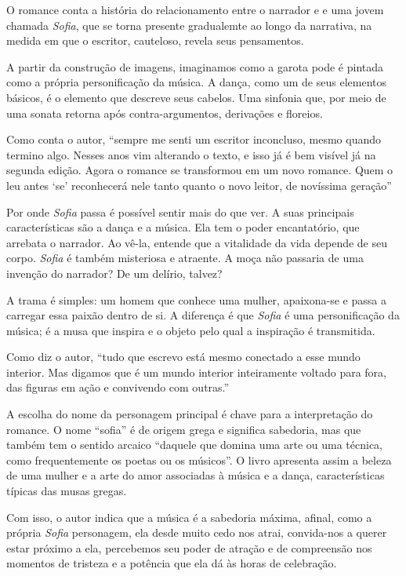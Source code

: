 \documentclass[12pt]{extarticle}
\begin{document}
O romance conta a história do relacionamento entre o narrador e e uma
jovem chamada \textit{Sofia}, que se torna
presente gradualemte ao longo da narrativa, na medida em que  
o escritor, cauteloso, revela seus pensamentos.  

A partir da construção de imagens, imaginamos como a garota 
pode é pintada como a própria personificação da música. A dança, como 
um de seus elementos básicos, é o elemento que descreve seus
cabelos. Uma sinfonia que, por meio de uma
sonata retorna após contra-argumentos, derivações e floreios.  


Como conta o autor, “sempre me senti um escritor inconcluso, 
mesmo quando termino algo. Nesses anos vim alterando o texto, 
e isso já é bem visível já na segunda edição. Agora o romance 
se transformou em um novo romance. Quem o leu antes ‘se’ reconhecerá 
nele tanto quanto o novo leitor, de novíssima geração”

Por onde \textit{Sofia} passa é possível sentir mais do que ver. 
A suas principais características são a dança e a música. 
Ela tem o poder encantatório, que arrebata o narrador. Ao vê-la,
entende que a vitalidade da vida depende de seu corpo. 
\textit{Sofia} é também misteriosa e atraente. A moça 
não passaria de uma invenção do narrador? De um delírio, talvez?  

A trama é simples: um homem que conhece uma mulher, apaixona-se e passa a
carregar essa paixão dentro de si. A diferença é que \textit{Sofia} é uma personificação
da música; é a musa que inspira e o objeto pelo qual a inspiração é
transmitida. 

Como diz o autor, ``tudo que escrevo está mesmo conectado 
a esse mundo interior. Mas digamos que é um mundo interior inteiramente 
voltado para fora, das figuras em ação e convivendo com outras.'' 

A escolha do nome da personagem principal é chave para a interpretação 
do romance. O nome ``sofia'' é de origem grega e significa sabedoria, 
mas que também tem o sentido arcaico ``daquele que domina uma arte 
ou uma técnica, como frequentemente os poetas ou os músicos''. 
O livro apresenta assim a beleza de uma mulher e a arte do amor
associadas à música e a dança, características típicas das 
musas gregas.

Com isso, o autor indica que
a música é a sabedoria máxima, afinal, como a própria \textit{Sofia} personagem, ela
desde muito cedo nos atrai, convida-nos a querer estar próximo a ela,
percebemos seu poder de atração e de compreensão nos momentos de tristeza e a
potência que ela dá às horas de celebração.  
\end{document}

